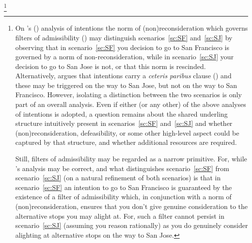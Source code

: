 \documentclass[10pt]{article}
\begin{document}
\footnote{
  On \citeauthor{Bratman:1987aa}'s (\citeyear{Bratman:1987aa}) analysis of intentions the norm of (non)reconsideration which governs filters of admissibility (\citeyear[\S5.2.1]{Bratman:1987aa}) may distinguish scenarios~\ref{sc:SF} and~\ref{sc:SJ} by observing that in scenario~\ref{sc:SF} you decision to go to San Francisco is governed by a norm of non-reconsideration, while in scenario~\ref{sc:SJ} your decision to go to San Jose is not, or that this norm is rescinded.
  Alternatively, \citeauthor{McCann:1991aa} argues that intentions carry a \emph{ceteris paribus} clause (\citeyear[33--34]{McCann:1991aa}) and these may be triggered on the way to San Jose, but not on the way to San Francisco.
  However, isolating a distinction between the two scenarios is only part of an overall analysis.
  Even if either (or any other) of the above analyses of intentions is adopted, a question remains about the shared underling structure intuitively present in scenarios~\ref{sc:SF} and~\ref{sc:SJ} and whether (non)reconsideration, defeasibility, or some other high-level aspect could be captured by that structure, and whether additional resources are required.

  Still, filters of admissibility may be regarded as a narrow primitive.
  For, while \citeauthor{Bratman:1987aa}'s analysis may be correct, and what distinguishes scenario~\ref{sc:SF} from scenario~\ref{sc:SJ} (on a natural refinement of both scenarios) is that in scenario~\ref{sc:SF} an intention to go to San Francisco is guaranteed by the existence of a filter of admissibility which, in conjunction with a norm of (non)reconsideration, ensures that you don't give genuine consideration to the alternative stops you may alight at.
  For, such a filter cannot persist in scenario~\ref{sc:SJ} (assuming you reason rationally) as you do genuinely consider alighting at alternative stops on the way to San Jose.

}
\end{document}
